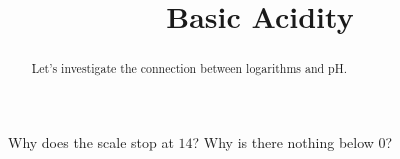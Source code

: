 \documentclass{ximera}
\title{Basic Acidity}
\begin{document}
\begin{abstract}
Let's investigate the connection between logarithms and pH.
\end{abstract}
\maketitle






\begin{question}
Why does the scale stop at $14$? Why is there nothing below $0$?
\end{question}
\end{document}
